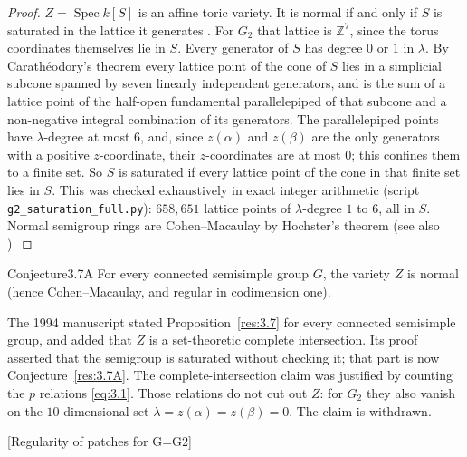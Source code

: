 \documentclass[12pt,letterpaper]{amsart}
\theoremstyle{plain}
\theoremstyle{definition}
\theoremstyle{remark}
\theoremstyle{definition}
\newcommand{\zzz}{\mathbb{Z}}
\begin{document}
\begin{proof}
$Z=\operatorname{Spec}k[S]$ is an affine toric variety. It is normal if and
only if $S$ is saturated in the lattice it generates \cite[Ch.~I, Theorem~1]{Ke72}.
For $G_2$ that lattice is $\zzz^7$, since the torus coordinates themselves
lie in $S$. Every generator of $S$ has degree $0$ or $1$ in $\lambda$. By
Carath\'eodory's theorem every lattice point of the cone of $S$ lies in a
simplicial subcone spanned by seven linearly independent generators, and is
the sum of a lattice point of the half-open fundamental parallelepiped of that
subcone and a non-negative integral combination of its generators. The
parallelepiped points have $\lambda$-degree at most $6$, and, since
$z(\alpha)$ and $z(\beta)$ are the only generators with a positive
$z$-coordinate, their $z$-coordinates are at most $0$; this confines them to
a finite set. So $S$ is saturated if every lattice point of the cone in that
finite set lies in $S$. This was checked exhaustively in exact integer
arithmetic (script \texttt{g2\_saturation\_full.py}): $658{,}651$ lattice
points of $\lambda$-degree $1$ to $6$, all in $S$. Normal semigroup rings are Cohen--Macaulay by Hochster's theorem
\cite{Ho72} (see also \cite[Ch.~I, Theorem~14]{Ke72}).
\end{proof}

\begin{res}{Conjecture}{3.7A}\label{res:3.7A}
For every connected semisimple group $G$, the variety $Z$ is normal (hence
Cohen--Macaulay, and regular in codimension one).
\end{res}

\begin{rem26}[Lemma~3.7 of 1994]\label{rem:3.7}
The 1994 manuscript stated Proposition~\ref{res:3.7} for every connected
semisimple group, and added that $Z$ is a set-theoretic complete intersection.
Its proof asserted that the semigroup is saturated without checking it; that
part is now Conjecture~\ref{res:3.7A}. The complete-intersection claim was
justified by counting the $p$ relations \eqref{eq:3.1}. Those relations do not
cut out $Z$: for $G_2$ they also vanish on the $10$-dimensional set
$\lambda=z(\alpha)=z(\beta)=0$. The claim is withdrawn.
\end{rem26}
[Regularity of patches for G=G2]\label{sec:4}
\end{document}
